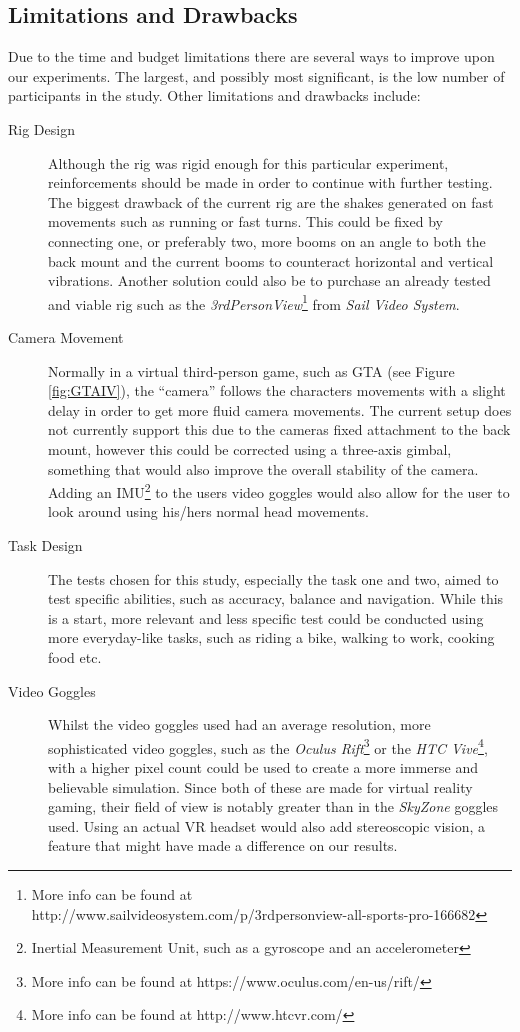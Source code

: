 \documentclass[runningheads,a4paper,oribibl]{llncs}
\begin{document}
\subsection{Limitations and Drawbacks}
Due to the time and budget limitations there are several ways to improve upon our experiments. The largest, and possibly most significant, is the low number of participants in the study. Other limitations and drawbacks include:
\begin{description}
	\item[Rig Design] Although the rig was rigid enough for this particular experiment, reinforcements should be made in order to continue with further testing. The biggest drawback of the current rig are the shakes generated on fast movements such as running or fast turns. This could be fixed by connecting one, or preferably two, more booms on an angle to both the back mount and the current booms to counteract horizontal and vertical vibrations. Another solution could also be to purchase an already tested and viable rig such as the \emph{3rdPersonView}\footnote{More info can be found at http://www.sailvideosystem.com/p/3rdpersonview-all-sports-pro-166682} from \emph{Sail Video System}.

	\item[Camera Movement] Normally in a virtual third-person game, such as GTA (see Figure \ref{fig:GTAIV}), the ``camera'' follows the characters movements with a slight delay in order to get more fluid camera movements. The current setup does not currently support this due to the cameras fixed attachment to the back mount, however this could be corrected using a three-axis gimbal, something that would also improve the overall stability of the camera. Adding an IMU\footnote{Inertial Measurement Unit, such as a gyroscope and an accelerometer} to the users video goggles would also allow for the user to look around using his/hers normal head movements.

	\item[Task Design] The tests chosen for this study, especially the task one and two, aimed to test specific abilities, such as accuracy, balance and navigation. While this is a start, more relevant and less specific test could be conducted using more everyday-like tasks, such as riding a bike, walking to work, cooking food etc.

	\item[Video Goggles] Whilst the video goggles used had an average resolution, more sophisticated video goggles, such as the \emph{Oculus Rift}\footnote{More info can be found at https://www.oculus.com/en-us/rift/} or the \emph{HTC Vive}\footnote{More info can be found at http://www.htcvr.com/}, with a higher pixel count could be used to create a more immerse and believable simulation. Since both of these are made for virtual reality gaming, their field of view is notably greater than in the \emph{SkyZone} goggles used. Using an actual VR headset would also add stereoscopic vision, a feature that might have made a difference on our results.


\end{description}
\end{document}
